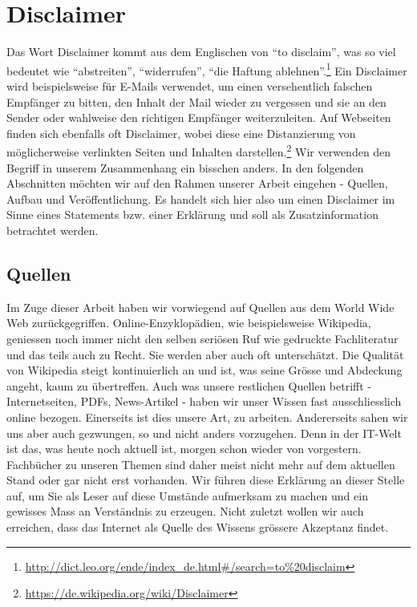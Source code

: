 \section{Disclaimer}
Das Wort Disclaimer kommt aus dem Englischen von ``to disclaim'', was so viel bedeutet wie ``abstreiten'', ``widerrufen'', ``die Haftung ablehnen''.\footnote{\url{http://dict.leo.org/ende/index_de.html\#/search=to\%20disclaim}}
Ein Disclaimer wird beispielsweise für E-Mails verwendet, um einen versehentlich falschen Empfänger zu bitten, den Inhalt der Mail wieder zu vergessen und sie an den Sender oder wahlweise den richtigen Empfänger weiterzuleiten. Auf Webseiten finden sich ebenfalls oft Disclaimer, wobei diese eine Distanzierung von möglicherweise verlinkten Seiten und Inhalten darstellen.\footnote{\url{https://de.wikipedia.org/wiki/Disclaimer}}
Wir verwenden den Begriff in unserem Zusammenhang ein bisschen anders. In den folgenden Abschnitten möchten wir auf den Rahmen unserer Arbeit eingehen - Quellen, Aufbau und Veröffentlichung. Es handelt sich hier also um einen Disclaimer im Sinne eines Statements bzw. einer Erklärung und soll als Zusatzinformation betrachtet werden.


\subsection{Quellen}
Im Zuge dieser Arbeit haben wir vorwiegend auf Quellen aus dem World Wide Web zurückgegriffen. Online-Enzyklopädien, wie beispielsweise Wikipedia, geniessen noch immer nicht den selben seriösen Ruf wie gedruckte Fachliteratur und das teils auch zu Recht. Sie werden aber auch oft unterschätzt. Die Qualität von  Wikipedia steigt kontinuierlich an und ist, was seine Grösse und Abdeckung angeht, kaum zu übertreffen. Auch was unsere restlichen Quellen betrifft - Internetseiten, PDFs, News-Artikel - haben wir unser Wissen fast ausschliesslich online bezogen. Einerseits ist dies unsere Art, zu arbeiten. Andererseits sahen wir uns aber auch gezwungen, so und nicht anders vorzugehen. Denn in der IT-Welt ist das, was heute noch aktuell ist, morgen schon wieder von vorgestern. Fachbücher zu unseren Themen sind daher meist nicht mehr auf dem aktuellen Stand oder gar nicht erst vorhanden. Wir führen diese Erklärung an dieser Stelle auf, um Sie als Leser auf diese Umstände aufmerksam zu machen und ein gewisses Mass an Verständnis zu erzeugen. Nicht zuletzt wollen wir auch erreichen, dass das Internet als Quelle des Wissens grössere Akzeptanz findet.

